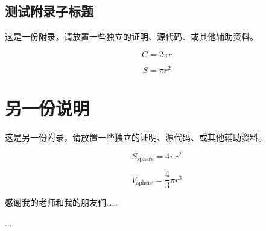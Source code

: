 \documentclass[lang=chs, degree=master, blindreview=false, adobe=false]{yanputhesis}
\begin{document}
\section{测试附录子标题}

这是一份附录，请放置一些独立的证明、源代码、或其他辅助资料。


\begin{equation}
    C = 2 \pi r
\end{equation}

\begin{equation}
    S = \pi r^2
\end{equation}

\cleardoublepage

\chapter{另一份说明}

这是另一份附录，请放置一些独立的证明、源代码、或其他辅助资料。


\begin{equation}
    S_{\text{sphere}} = 4 \pi r^2
\end{equation}

\begin{equation}
    V_{\text{sphere}} = \frac43 \pi r^3
\end{equation}

\cleardoublepage
\backmatter                                                 %
\begin{acknowledgements}                                    %
    感谢我的老师和我的朋友们……
\end{acknowledgements}                                      %
\begin{accomplishments}                                     %
    [1] ...
\end{accomplishments}                                       %
\makestatement                                              %
\end{document}
